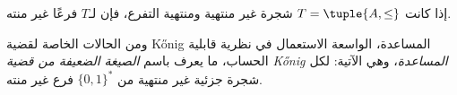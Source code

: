 \documentclass[../../../include/open-logic-section]{subfiles}
\begin{document}
\begin{prop}
إذا كانت $T = \tuple{A,\le}$ شجرة غير منتهية ومنتهية التفرع، فإن لـ$T$
فرعًا غير منته.
\end{prop}

ومن الحالات الخاصة لقضية \foreignlanguage{english}{K\H{o}nig} المساعدة، الواسعة الاستعمال في نظرية
قابلية الحساب، ما يعرف باسم \emph{الصيغة الضعيفة من قضية \foreignlanguage{english}{K\H{o}nig} المساعدة}، وهي الآتية:
لكل شجرة جزئية غير منتهية من $\{0,1\}^*$ فرع غير منته.
\end{document}
